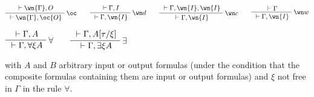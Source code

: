 \(\AxRule{{}\vdash\wn{\Gamma},O}
\LabelRule{\oc}
\UnaRule{{}\vdash\wn{\Gamma},\oc{O}}
\DisplayProof
\qquad
\AxRule{{}\vdash\Gamma,I}
\LabelRule{\wn d}
\UnaRule{{}\vdash\Gamma,\wn{I}}
\DisplayProof
\qquad
\AxRule{{}\vdash\Gamma,\wn{I},\wn{I}}
\LabelRule{\wn c}
\UnaRule{{}\vdash\Gamma,\wn{I}}
\DisplayProof
\qquad
\AxRule{{}\vdash\Gamma}
\LabelRule{\wn w}
\UnaRule{{}\vdash\Gamma,\wn{I}}
\DisplayProof\)

\(\AxRule{{}\vdash\Gamma,A}
\LabelRule{\forall}
\UnaRule{{}\vdash\Gamma,\forall\xi A}
\DisplayProof
\qquad
\AxRule{{}\vdash\Gamma,A[\tau/\xi]}
\LabelRule{\exists}
\UnaRule{{}\vdash\Gamma,\exists\xi A}
\DisplayProof\)

with \(A\) and \(B\) arbitrary input or output formulas (under the
condition that the composite formulas containing them are input or
output formulas) and \(\xi\) not free in \(\Gamma\) in the rule
\(\forall\).

